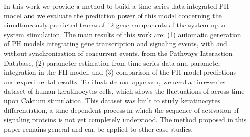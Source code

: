 In this work we provide a method to build a time-series data integrated PH model and we evaluate 
the prediction power of this model concerning the simultaneously predicted traces of 12 gene components of the system upon system stimulation.
The main  results of this work are: (1) automatic generation of PH models integrating gene transcription and signaling events, 
with and without synchronization of concurrent events, from the Pathways Interaction Database, 
(2) parameter estimation from time-series data and parameter integration in the PH model, and
(3) comparison of the PH model predictions and experimental results.
To illustrate our approach, we used a time-series dataset of human keratinocytes cells, which shows
 the fluctuations of  across time upon Calcium stimulation.
This dataset was built to study keratinocytes differentiation, a time-dependent
 process in which the sequence of activation of signaling proteins is not yet completely understood.
The method proposed in this paper remains general and can be applied to other case-studies.



 
